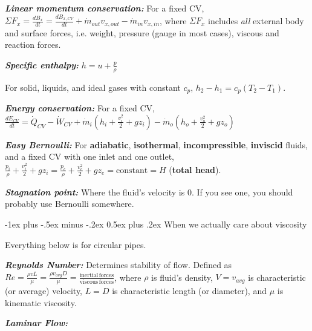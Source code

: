 \documentclass[10pt,landscape,letterpaper]{article}
\makeatletter
\renewcommand{\subsection}{\@startsection{subsection}{2}{0mm}%
                                {-1ex plus -.5ex minus -.2ex}%
                                {0.5ex plus .2ex}%
                                {\normalfont\normalsize\bfseries}}
\newcommand{\fsheetlabel}[1]{\textcolor{FSheetLabelColor}{\textbf{\textit{#1}}}}
\makeatother
\begin{document}
\begin{multicols*}{3}
\begin{minipage}{\columnwidth}
        \fsheetlabel{Linear momentum conservation:} For a fixed CV, $ \Sigma F_x = \frac{dB_x}{dt} = \frac{dB_{x,CV}}{dt} + \dot{m}_{out} v_{x,out} - \dot{m}_{in} v_{x,in} $, where $ \Sigma F_x $ includes \textit{all} external body and surface forces, i.e. weight, pressure (gauge in most cases), viscous and reaction forces.
        
        \fsheetlabel{Specific enthalpy:} $ h = u + \frac{p}{\rho} $
        
        For solid, liquids, and ideal gases with constant $c_p$, $ h_2 - h_1 = c_p \left( T_2 - T_1 \right) $.
        
        \fsheetlabel{Energy conservation:} For a fixed CV, $ \frac{dE_{CV}}{dt} = \dot{Q}_{CV} - \dot{W}_{CV} + \dot{m}_i \left( h_i + \frac{v_i^2}{2} + g z_i \right) - \dot{m}_o \left( h_o + \frac{v_o^2}{2} + g z_o \right)$
        
        \fsheetlabel{Easy Bernoulli:} For \textbf{adiabatic}, \textbf{isothermal}, \textbf{incompressible}, \textbf{inviscid} fluids, and a fixed CV with one inlet and one outlet, $ \frac{p_i}{\rho} + \frac{v_i^2}{2} + g z_i = \frac{p_e}{\rho} + \frac{v_e^2}{2} + g z_e = \mathrm{constant} = H$ (\textbf{total head}).
        
        \fsheetlabel{Stagnation point:} Where the fluid's velocity is 0. If you see one, you should probably use Bernoulli somewhere.
    \end{minipage}
    \vspace{2ex plus .5ex minus .5ex}
    
    \begin{minipage}{\columnwidth}\raggedright
        \subsection{When we actually care about viscosity}
        
        Everything below is for circular pipes.
        
        \fsheetlabel{Reynolds Number:} Determines stability of flow. Defined as $ Re = \frac{\rho v L}{\mu} = \frac{\rho v_{avg} D}{\mu} = \frac{\mathrm{inertial \,forces}}{\mathrm{viscous \,forces}} $, where $ \rho $ is fluid's density, $ V = v_{avg} $ is characteristic (or average) velocity, $ L = D $ is characteristic length (or diameter), and $ \mu $ is kinematic viscosity.
        
        \fsheetlabel{Laminar Flow:}
        

\end{minipage}
\end{multicols*}
\end{document}
